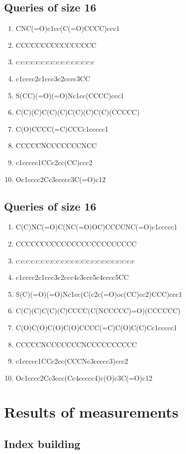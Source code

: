 \documentclass[12pt,a4paper]{report}
\begin{document}
\newpage
\subsection*{Queries of size 16}
\begin{enumerate}
	\item CNC(=O)c1cc(C(=O)CCCC)ccc1
	\item CCCCCCCCCCCCCCCC
	\item c:c:c:c:c:c:c:c:c:c:c:c:c:c:c:c
	\item c1cccc2c1ccc3c2cccc3CC
	\item S(CC)(=O)(=O)Nc1cc(CCCC)ccc1
	\item C(C)(C)C(C)(C)C(C)(C)C(C)(CCCCC)
	\item C(O)CCCC(=C)CCCc1ccccc1
	\item CCCCCNCCCCCCCNCC
	\item c1ccccc1CCc2cc(CC)ccc2
	\item Oc1cccc2Cc3ccccc3C(=O)c12
\end{enumerate}

\subsection*{Queries of size 16}
\begin{enumerate}
	\item C(C)NC(=O)C(NC(=O)OC)CCCCNC(=O)c1ccccc1
	\item CCCCCCCCCCCCCCCCCCCCCCCC
	\item c:c:c:c:c:c:c:c:c:c:c:c:c:c:c:c:c:c:c:c:c:c:c:c
	\item c1cccc2c1ccc3c2ccc4c3ccc5c4cccc5CC
	\item S(C)(=O)(=O)Nc1cc(C(c2c(=O)oc(CC)cc2)CCC)ccc1
	\item C(C)(C)C(C)(C)CCCC(C(NCCCCC)=O)(CCCCCC)
	\item C(O)C(O)C(O)C(O)CCCC(=C)C(O)C(C)Cc1ccccc1
	\item CCCCCNCCCCCCCNCCCCCCCCCC
	\item c1ccccc1CCc2cc(CCCNc3ccccc3)ccc2
	\item Oc1cccc2Cc3ccc(Cc4ccccc4)c(O)c3C(=O)c12
\end{enumerate}

\newpage
\section*{Results of measurements} \label{measurements}
\subsection*{Index building}
\end{document}
